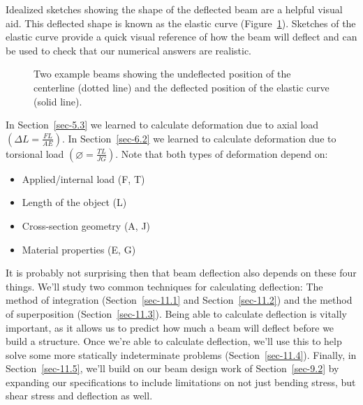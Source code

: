 \documentclass[
  letterpaper,
  DIV=11,
  numbers=noendperiod]{scrreprt}
\theoremstyle{definition}
\theoremstyle{remark}
\begin{document}
Idealized sketches showing the shape of the deflected beam are a helpful
visual aid. This deflected shape is known as the elastic curve
(Figure~\ref{fig-11.2}). Sketches of the elastic curve provide a quick
visual reference of how the beam will deflect and can be used to check
that our numerical answers are realistic.

\begin{figure}


\caption{\label{fig-11.2}Two example beams showing the undeflected
position of the centerline (dotted line) and the deflected position of
the elastic curve (solid line).}

\end{figure}%

In Section~\ref{sec-5.3} we learned to calculate deformation due to
axial load \(\left(\Delta L=\frac{F L}{A E}\right)\). In
Section~\ref{sec-6.2} we learned to calculate deformation due to
torsional load \(\left(\varnothing=\frac{T L}{J G}\right)\). Note that
both types of deformation depend on:

\begin{itemize}
\item
  Applied/internal load (F, T)
\item
  Length of the object (L)
\item
  Cross-section geometry (A, J)
\item
  Material properties (E, G)
\end{itemize}

It is probably not surprising then that beam deflection also depends on
these four things. We'll study two common techniques for calculating
deflection: The method of integration (Section~\ref{sec-11.1} and
Section~\ref{sec-11.2}) and the method of superposition
(Section~\ref{sec-11.3}). Being able to calculate deflection is vitally
important, as it allows us to predict how much a beam will deflect
before we build a structure. Once we're able to calculate deflection,
we'll use this to help solve some more statically indeterminate problems
(Section~\ref{sec-11.4}). Finally, in Section~\ref{sec-11.5}, we'll
build on our beam design work of Section~\ref{sec-9.2} by expanding our
specifications to include limitations on not just bending stress, but
shear stress and deflection as well.
\end{document}
